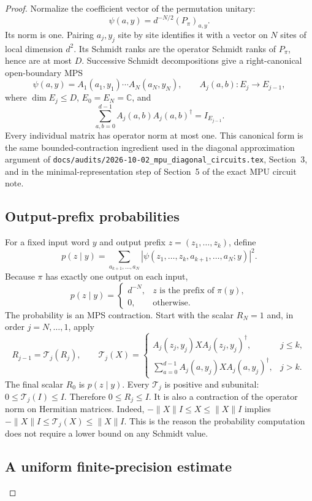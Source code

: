 \documentclass[11pt]{article}
\begin{document}
\begin{proof}
Normalize the coefficient vector of the permutation unitary:
\[
 \psi(a,y)=d^{-N/2}(P_\pi)_{a,y}.
\]
Its norm is one. Pairing $a_j,y_j$ site by site identifies it with
a vector on $N$ sites of local dimension $d^2$. Its Schmidt ranks
are the operator Schmidt ranks of $P_\pi$, hence are at most $D$.
Successive Schmidt decompositions give a right-canonical
open-boundary MPS
\[
 \psi(a,y)=A_1(a_1,y_1)\cdots A_N(a_N,y_N),\qquad
 A_j(a,b):E_j\longrightarrow E_{j-1},
\]
where $\dim E_j\le D$, $E_0=E_N=\mathbb C$, and
\[
 \sum_{a,b=0}^{d-1} A_j(a,b)A_j(a,b)^\dagger=I_{E_{j-1}}.
\]
Every individual matrix has operator norm at most one.
This canonical form is the same bounded-contraction ingredient
used in the diagonal approximation argument of
\nolinkurl{docs/audits/2026-10-02_mpu_diagonal_circuits.tex},
Section~3, and in the minimal-representation
step of Section~5 of the exact MPU circuit note.

\subsection*{Output-prefix probabilities}

For a fixed input word $y$ and output prefix
$z=(z_1,\ldots,z_k)$, define
\[
 p(z\mid y)=\sum_{a_{k+1},\ldots,a_N}
       |\psi(z_1,\ldots,z_k,a_{k+1},\ldots,a_N;y)|^2.
\]
Because $\pi$ has exactly one output on each input,
\[
 p(z\mid y)=
 \begin{cases}
  d^{-N},& z\text{ is the prefix of }\pi(y),\\
  0,&\text{otherwise}.
 \end{cases}
\]
The probability is an MPS contraction. Start with the scalar
$R_N=1$ and, in order $j=N,\ldots,1$, apply
\[
 R_{j-1}=\mathcal T_j(R_j),\qquad
 \mathcal T_j(X)=
 \begin{cases}
  A_j(z_j,y_j)X A_j(z_j,y_j)^\dagger,&j\le k,\\[2pt]
  \displaystyle\sum_{a=0}^{d-1}
       A_j(a,y_j)X A_j(a,y_j)^\dagger,&j>k.
 \end{cases}
\]
The final scalar $R_0$ is $p(z\mid y)$.
Every $\mathcal T_j$ is positive and subunital:
$0\le\mathcal T_j(I)\le I$. Therefore $0\le R_j\le I$.
It is also a contraction of the operator norm on Hermitian
matrices. Indeed, $-\|X\|I\le X\le\|X\|I$ implies
$-\|X\|I\le\mathcal T_j(X)\le\|X\|I$.
This is the reason the probability computation does not require
a lower bound on any Schmidt value.

\subsection*{A uniform finite-precision estimate}


\end{proof}
\end{document}
